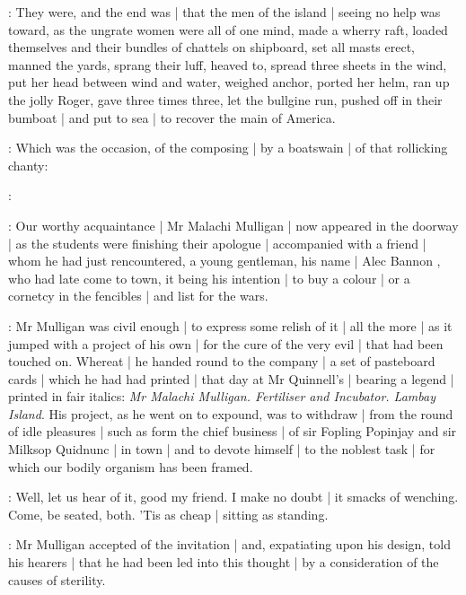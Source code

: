 \stephen:
They were,
and the end was |
that the men of the island |
seeing no help was toward,
as the ungrate women were all of one mind,
made a wherry raft,
loaded themselves and their bundles of chattels on shipboard,
set all masts erect,
manned the yards,
sprang their luff,
heaved to,
spread three sheets in the wind,
put her head between wind and water,
weighed anchor,
ported her helm,
ran up the jolly Roger,
gave three times three,
let the bullgine run,
pushed off in their bumboat |
and put to sea |
to recover the main of America.

\lynch:
Which was the occasion,
of the composing |
by a boatswain |
of that rollicking chanty:

\lynch:
%




:
Our worthy acquaintance |
Mr Malachi Mulligan  |
now appeared in the doorway |
as the students were finishing their apologue |
accompanied with a friend |
whom he had just rencountered,
a young gentleman,
his name |
Alec Bannon ,
who had late come to town,
it being his intention |
to buy a colour |
or a cornetcy in the fencibles |
and list for the wars.

:
Mr Mulligan was civil enough |
to express some relish of it |
all the more |
as it jumped with a project of his own |
for the cure of the very evil |
that had been touched on.
Whereat |
he handed round to the company |
a set of pasteboard cards |
which he had had printed |
that day at Mr Quinnell's |
bearing a legend |
printed in fair italics:
\emph{Mr Malachi Mulligan.
Fertiliser and Incubator.
Lambay Island}.
His project,
as he went on to expound,
was to withdraw |
from the round of idle pleasures |
such as form the chief business |
of sir Fopling Popinjay and sir Milksop Quidnunc |
in town |
and to devote himself |
to the noblest task |
for which our bodily organism has been framed.

\dixon:
Well,
let us hear of it,
good my friend.
I make no doubt |
it smacks of wenching.
Come,
be seated,
both.
'Tis as cheap |
sitting as standing.

:
Mr Mulligan accepted of the invitation |
and,
expatiating upon his design,
told his hearers |
that he had been led into this thought |
by a consideration of the causes of sterility.

